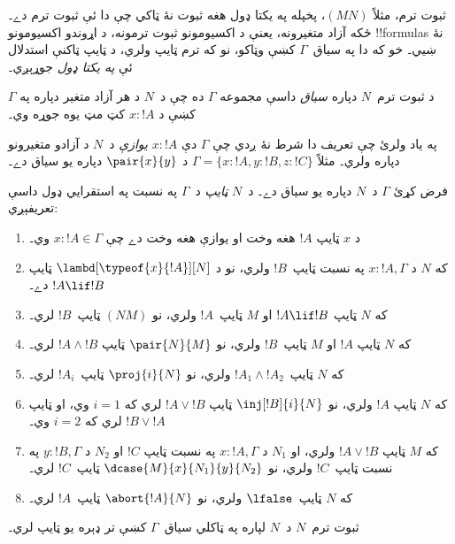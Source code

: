 \documentclass[../../../include/open-logic-section]{subfiles}
\begin{document}


ثبوت ترم، مثلاً $(MN)$، پخپله په يکتا ډول هغه ثبوت
نۀ ټاکي چې دا ئې ثبوت ترم دے۔ ځکه آزاد متغيرونه، يعنې
د اکسيومونو ثبوت ترمونه، د اړوندو اکسيومونو !!{formula}s
نۀ ښيي۔ خو که دا په سياق~$\Gamma$ کښې وټاکو، نو
که ترم ټايپ ولري، د ټايپ ټاکنې استدلال ئې \emph{په يکتا ډول} جوړېږي۔

\begin{defn}
د ثبوت ترم~$N$ دپاره \emph{سياق} داسې مجموعه $\Gamma$
ده چې د~$N$ د هر آزاد متغير دپاره په $\Gamma$ کښې
د $x : !A$ کټ مټ يوه جوړه وي۔
\end{defn}

په ياد ولرئ چې تعريف دا شرط نۀ ږدي چې $\Gamma$
دې $x:!A$ \emph{يوازې} د~$N$ د آزادو متغيرونو دپاره
ولري۔ مثلاً $\Gamma = \{x:!A, y:!B, z:!C\}$
د $\pair{x}{y}$ دپاره يو سياق دے۔

\begin{defn}
  فرض کړئ $\Gamma$ د~$N$ دپاره يو سياق دے۔ د~$N$
  \emph{ټايپ} د~$\Gamma$ په نسبت په استقرايي ډول داسې
  تعريفېږي:
  \begin{enumerate}
  \item د $x$ ټايپ $!A$ هغه وخت او يوازې هغه وخت دے
  چې $x:!A \in \Gamma$ وي۔
  \item که $N$ د $x:!A, \Gamma$ په نسبت ټايپ~$!B$
  ولري، نو د $\lambd[\typeof{x}{!A}][N]$ ټايپ $!A \lif !B$ دے۔
  \item که $N$ ټايپ $!A \lif !B$ او $M$ ټايپ~$!A$
  ولري، نو $(NM)$ ټايپ~$!B$ لري۔
  \item که $N$ ټايپ $!A$ او $M$ ټايپ~$!B$ ولري،
  نو $\pair{N}{M}$ ټايپ $!A \land !B$ لري۔
  \item که $N$ ټايپ~$!A_1 \land !A_2$ ولري، نو
  $\proj{i}{N}$ ټايپ~$!A_i$ لري۔
  \item که $N$ ټايپ $!A$ ولري، نو
  $\inj[!B]{i}{N}$ ټايپ $!A \lor !B$ لري که $i=1$
  وي، او ټايپ $!B \lor !A$ لري که $i=2$ وي۔
  \item که $M$ ټايپ $!A \lor !B$ ولري، او $N_1$
  د $x:!A, \Gamma$ په نسبت ټايپ $!C$ او $N_2$
  د $y:!B, \Gamma$ په نسبت ټايپ~$!C$ ولري، نو
  $\dcase{M}{x}{N_1}{y}{N_2}$ ټايپ~$!C$ لري۔
  \item که $N$ ټايپ~$\lfalse$ ولري، نو
  $\abort{!A}{N}$ ټايپ~$!A$ لري۔
  \end{enumerate}
\end{defn}

\begin{prop}
ثبوت ترم~$N$ د~$N$ لپاره په ټاکلي سياق~$\Gamma$ کښې
تر ډېره يو ټايپ لري۔
\end{prop}
\end{document}
